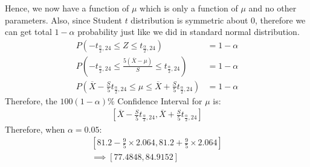 \documentclass[a4paper]{article}
\begin{document}
Hence, we now have a function of $\mu$ which is only a function of $\mu$ and no other parameters. Also, since Student $t$ distribution is symmetric about 0, therefore we can get total $1-\alpha$ probability just like we did in standard normal distribution.
\begin{equation*}
	\begin{split}
		P\left( -t_{\frac{\alpha}{2},24} \le Z \le t_{\frac{\alpha}{2},24} \right) &=  1-\alpha\\
		P\left( -t_{\frac{\alpha}{2},24}  \le \frac{5\left( \overline{X}-\mu \right) }{S}\le t_{\frac{\alpha}{2},24}\right) &= 1-\alpha\\
		P\left( \overline{X} - \frac{S}{5} t_{\frac{\alpha}{2},24} \le  \mu \le \overline{X} + \frac{S}{5}t_{\frac{\alpha}{2},24} \right)  &=  1-\alpha
	\end{split}
\end{equation*}
Therefore, the $100\left( 1-\alpha \right) \%$ Confidence Interval for $\mu$ is:
 \begin{equation*}
	\begin{split}
		\left[ \overline{X} - \frac{S}{5}t_{\frac{\alpha}{2},24}, \overline{X} + \frac{S}{5}t_{\frac{\alpha}{2},24} \right] 
	\end{split}
\end{equation*}
Therefore, when $\alpha = 0.05$:
 \begin{equation*}
	\begin{split}
		\left[81.2 - \frac{9}{5} \times 2.064 , 81.2 + \frac{9}{5}\times 2.064 \right]\\
		\implies\left[ 77.4848 , 84.9152 \right] 
	\end{split}
\end{equation*}
\newpage
\end{document}
